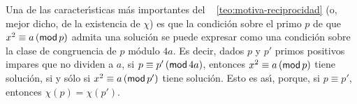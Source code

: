 Una de las caracter\'{\i}sticas m\'as importantes del \teoname~%
\ref{teo:motiva-reciprocidad} (o, mejor dicho, de la existencia de $\chi$)
es que la condici\'on sobre el primo $p$ de que
$x^2\equiv a\tmodulo[p]$ admita una soluci\'on se puede expresar como
una condici\'on sobre la clase de congruencia de $p$ m\'odulo $4a$.
Es decir, dados $p$ y $p'$ primos positivos impares que no dividen a $a$,
si $p\equiv p'\tmodulo[4a]$, entonces $x^2\equiv a\tmodulo[p]$
tiene soluci\'on, si y s\'olo si $x^2\equiv a\tmodulo[p']$ tiene soluci\'on.
Esto es as\'{\i}, porque, si $p\equiv p'$, entonces $\chi(p)=\chi(p')$.

